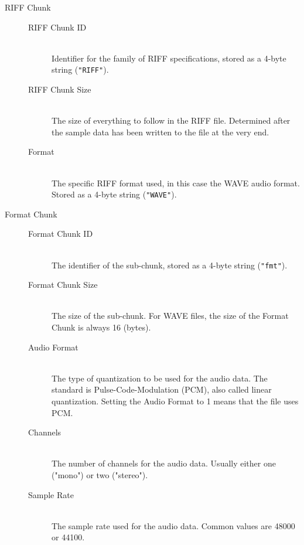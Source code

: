 \begin{description}

  \item[RIFF Chunk] \hfill

  \begin{description}

    \item[RIFF Chunk ID] \hfill \\ Identifier for the family of RIFF specifications, stored as a 4-byte string (\texttt{"RIFF"}).

    \item[RIFF Chunk Size] \hfill \\ The size of everything to follow in the RIFF file. Determined after the sample data has been written to the file at the very end.

    \item[Format] \hfill \\ The specific RIFF format used, in this case the WAVE audio format. Stored as a 4-byte string (\texttt{"WAVE"}).

  \end{description}

  \item[Format Chunk] \hfill

  \begin{description}

    \item[Format Chunk ID] \hfill \\ The identifier of the sub-chunk, stored as a 4-byte string (\texttt{"fmt"}).

    \item[Format Chunk Size] \hfill \\ The size of the sub-chunk. For WAVE files, the size of the Format Chunk is always 16 (bytes).

    \item[Audio Format] \hfill \\ The type of quantization to be used for the audio data. The standard is Pulse-Code-Modulation (PCM), also called linear quantization. Setting the Audio Format to 1 means that the file uses PCM.

    \item[Channels] \hfill \\ The number of channels for the audio data. Usually either one ("mono") or two ("stereo").

    \item[Sample Rate] \hfill \\ The sample rate used for the audio data. Common values are 48000 or 44100.


\end{description}
\end{description}
